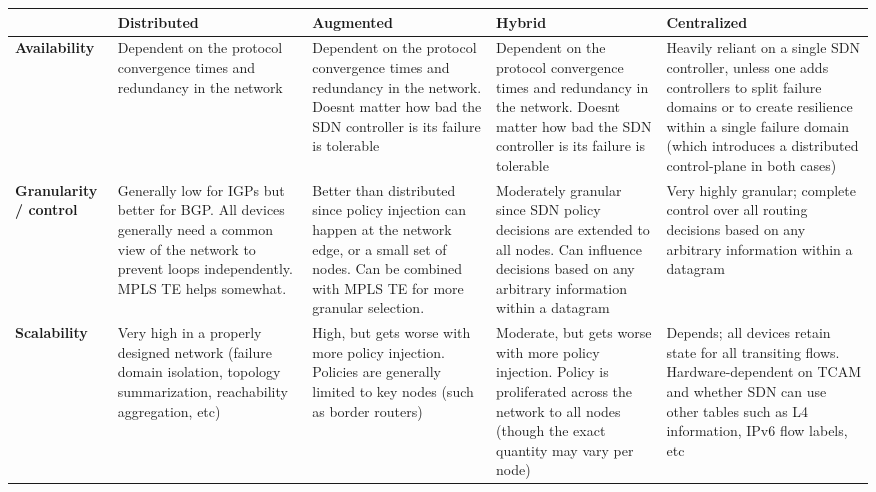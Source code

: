 \begin{longtable}{LLLLL}
\centering
\toprule
&
\textbf{Distributed}
&
\textbf{Augmented}
&
\textbf{Hybrid}
&
\textbf{Centralized}
\\ \midrule
\textbf{Availability}
&
Dependent on the protocol convergence times and redundancy in the network
&
Dependent on the protocol convergence times and redundancy in the network.
Doesnt matter how bad the SDN controller is its failure is tolerable
&
Dependent on the protocol convergence times and redundancy in the network.
Doesnt matter how bad the SDN controller is  its failure is tolerable
&
Heavily reliant on a single SDN controller, unless one adds controllers to
split failure domains or to create resilience within a single failure domain
(which introduces a distributed control-plane in both cases)
\\ \midrule
\textbf{Granularity / control}
&
Generally low for IGPs but better for BGP. All devices generally need a common
view of the network to prevent loops independently. MPLS TE helps somewhat.
&
Better than distributed since policy injection can happen at the network edge,
or a small set of nodes. Can be combined with MPLS TE for more granular selection.
&
Moderately granular since SDN policy decisions are extended to all nodes. Can
influence decisions based on any arbitrary information within a datagram
&
Very highly granular; complete control over all routing decisions based on any
arbitrary information within a datagram
\\ \midrule
\textbf{Scalability}
&
Very high in a properly designed network (failure domain isolation, topology
summarization, reachability aggregation, etc)
&
High, but gets worse with more policy injection. Policies are generally
limited to key nodes (such as border routers)
&
Moderate, but gets worse with more policy injection. Policy is proliferated
across the network to all nodes (though the exact quantity may vary per node)
&
Depends; all devices retain state for all transiting flows. Hardware-dependent
on TCAM and whether SDN can use other tables such as L4 information, IPv6 flow
labels, etc
\\
\bottomrule
\end{longtable}




